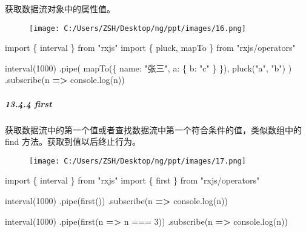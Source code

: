 \documentclass[
]{article}
\newenvironment{Shaded}{}{}
\newcommand{\BuiltInTok}[1]{#1}
\newcommand{\DataTypeTok}[1]{\textcolor[rgb]{0.56,0.13,0.00}{#1}}
\newcommand{\DecValTok}[1]{\textcolor[rgb]{0.25,0.63,0.44}{#1}}
\newcommand{\FunctionTok}[1]{\textcolor[rgb]{0.02,0.16,0.49}{#1}}
\newcommand{\ImportTok}[1]{#1}
\newcommand{\KeywordTok}[1]{\textcolor[rgb]{0.00,0.44,0.13}{\textbf{#1}}}
\newcommand{\NormalTok}[1]{#1}
\newcommand{\OperatorTok}[1]{\textcolor[rgb]{0.40,0.40,0.40}{#1}}
\newcommand{\StringTok}[1]{\textcolor[rgb]{0.25,0.44,0.63}{#1}}
\begin{document}
获取数据流对象中的属性值。

\begin{figure}
\centering
\texttt{[image: C:/Users/ZSH/Desktop/ng/ppt/images/16.png]}
\caption{}
\end{figure}

\begin{Shaded}
\begin{Highlighting}[]
\ImportTok{import}\NormalTok{ \{ interval \} }\ImportTok{from} \StringTok{"rxjs"}
\ImportTok{import}\NormalTok{ \{ pluck}\OperatorTok{,}\NormalTok{ mapTo \} }\ImportTok{from} \StringTok{"rxjs/operators"}

\FunctionTok{interval}\NormalTok{(}\DecValTok{1000}\NormalTok{)}
  \OperatorTok{.}\FunctionTok{pipe}\NormalTok{(}
  	\FunctionTok{mapTo}\NormalTok{(\{ }\DataTypeTok{name}\OperatorTok{:} \StringTok{"张三"}\OperatorTok{,} \DataTypeTok{a}\OperatorTok{:}\NormalTok{ \{ }\DataTypeTok{b}\OperatorTok{:} \StringTok{"c"}\NormalTok{ \} \})}\OperatorTok{,} 
  	\FunctionTok{pluck}\NormalTok{(}\StringTok{"a"}\OperatorTok{,} \StringTok{"b"}\NormalTok{)}
\NormalTok{	)}
  \OperatorTok{.}\FunctionTok{subscribe}\NormalTok{(n }\KeywordTok{=\textgreater{}} \BuiltInTok{console}\OperatorTok{.}\FunctionTok{log}\NormalTok{(n))}
\end{Highlighting}
\end{Shaded}

\hypertarget{1344-first}{%
\subparagraph{13.4.4 first}\label{1344-first}}

获取数据流中的第一个值或者查找数据流中第一个符合条件的值，类似数组中的
find 方法。获取到值以后终止行为。

\begin{figure}
\centering
\texttt{[image: C:/Users/ZSH/Desktop/ng/ppt/images/17.png]}
\caption{}
\end{figure}

\begin{Shaded}
\begin{Highlighting}[]
\ImportTok{import}\NormalTok{ \{ interval \} }\ImportTok{from} \StringTok{"rxjs"}
\ImportTok{import}\NormalTok{ \{ first \} }\ImportTok{from} \StringTok{"rxjs/operators"}

\FunctionTok{interval}\NormalTok{(}\DecValTok{1000}\NormalTok{)}
  \OperatorTok{.}\FunctionTok{pipe}\NormalTok{(}\FunctionTok{first}\NormalTok{())}
  \OperatorTok{.}\FunctionTok{subscribe}\NormalTok{(n }\KeywordTok{=\textgreater{}} \BuiltInTok{console}\OperatorTok{.}\FunctionTok{log}\NormalTok{(n))}

\FunctionTok{interval}\NormalTok{(}\DecValTok{1000}\NormalTok{)}
  \OperatorTok{.}\FunctionTok{pipe}\NormalTok{(}\FunctionTok{first}\NormalTok{(n }\KeywordTok{=\textgreater{}}\NormalTok{ n }\OperatorTok{===} \DecValTok{3}\NormalTok{))}
  \OperatorTok{.}\FunctionTok{subscribe}\NormalTok{(n }\KeywordTok{=\textgreater{}} \BuiltInTok{console}\OperatorTok{.}\FunctionTok{log}\NormalTok{(n))}
\end{Highlighting}
\end{Shaded}
\end{document}
